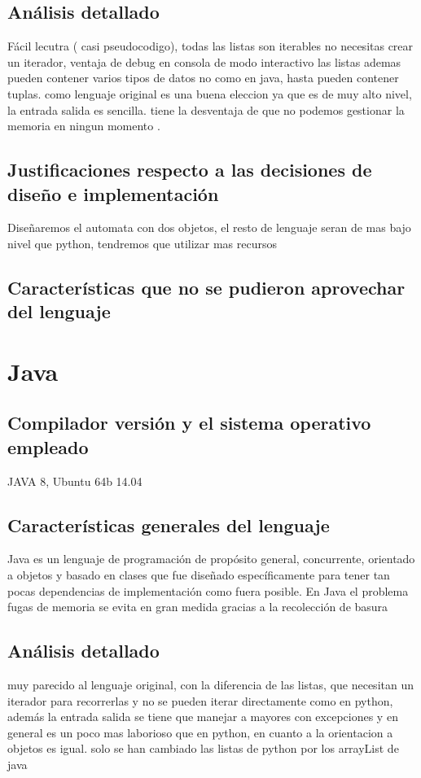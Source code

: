 \documentclass[12pt,a4paper]{article}
\begin{document}
  \subsection{Análisis detallado}
  Fácil lecutra ( casi pseudocodigo), todas las listas son iterables no necesitas crear un iterador, ventaja de debug en consola de modo interactivo
  las listas ademas pueden contener varios tipos de datos no como en java, hasta pueden contener tuplas. como lenguaje original es una buena eleccion ya
   que es de muy alto nivel, la entrada salida es sencilla. tiene la desventaja de que no podemos gestionar la memoria en ningun momento .
  
  \subsection{Justificaciones respecto a las decisiones de diseño e implementación}
  Diseñaremos el automata con dos objetos, el resto de lenguaje seran de mas bajo nivel que python, tendremos que utilizar mas recursos
  \subsection{Características que no se pudieron aprovechar del lenguaje}
  \section{Java}
   \subsection{Compilador versión y el sistema operativo empleado}
   JAVA 8, Ubuntu 64b 14.04
    \subsection{Características generales del lenguaje}
    Java es un lenguaje de programación de propósito general, concurrente, orientado a objetos y basado en clases que fue diseñado específicamente para tener tan pocas dependencias de implementación como fuera posible.
    En Java el problema fugas de memoria se evita en gran medida gracias a la recolección de basura
    \subsection{Análisis detallado}
    muy parecido al lenguaje original, con la diferencia de las listas, que necesitan un iterador para recorrerlas y no se pueden iterar
    directamente como en python, además la entrada salida se tiene que manejar a mayores con excepciones y en general es un poco mas laborioso que
    en python, en cuanto a la orientacion a objetos es igual. solo se han cambiado las listas de python por los arrayList de java
\end{document}
